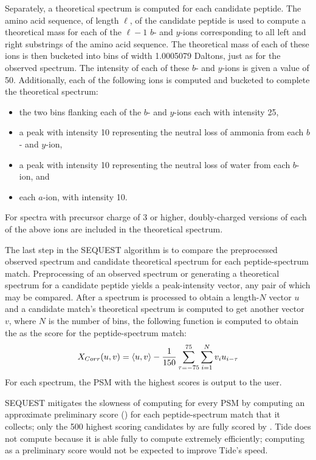 Separately, a theoretical spectrum is computed for each candidate
peptide. The amino acid sequence, of
length $\ell$, of the candidate peptide is used to compute a
theoretical mass for each of the $\ell-1$ $b$- and $y$-ions
corresponding to all left and right substrings of the amino acid
sequence.  The theoretical mass of each of these ions is then bucketed
into bins of width 1.0005079 Daltons, just as for the observed
spectrum. The intensity of each of these $b$- and $y$-ions is given a
value of 50. Additionally, each of the following ions is computed and
bucketed to complete the theoretical spectrum:
\begin{itemize}
\item the two bins flanking each of the $b$- and $y$-ions each with
  intensity 25,
\item a peak with intensity 10 representing the neutral loss of
  ammonia from each $b$- and $y$-ion,
\item a peak with intensity 10 representing the neutral loss of water
  from each $b$-ion, and
\item each $a$-ion, with intensity 10.
\end{itemize}
For spectra with precursor charge of 3 or higher, doubly-charged versions of
each of the above ions are included in the theoretical spectrum.

The last step in the SEQUEST algorithm is to compare the preprocessed
observed spectrum and candidate theoretical spectrum for each
peptide-spectrum match. Preprocessing of an observed spectrum or
generating a theoretical spectrum for a candidate peptide yields
a peak-intensity vector, any pair of which may be compared. After a
spectrum is processed to obtain a length-$N$ vector $u$ and a candidate
match's theoretical spectrum is computed to get another vector $v$,
where $N$ is the number of bins, the following function is computed to
obtain the \XCorr as the score for the peptide-spectrum match:
\[X_{Corr}(u,v)=\langle u,v\rangle-\frac{1}{150}\sum_{\tau=-75}^{75}{\sum_{i=1}^{N}{v_iu_{i-\tau}}}\]
For each spectrum, the PSM with the highest \XCorr scores is output
to the user.

SEQUEST mitigates the slowness of computing \XCorr for every PSM by
computing an approximate preliminary score (\Sp) for each
peptide-spectrum match that it collects; only the 500 highest scoring
candidates by \Sp are fully scored by \XCorr. Tide does not compute
\Sp because it is able fully to compute \XCorr extremely
efficiently; computing \Sp as a preliminary score would not be
expected to improve Tide's speed.

